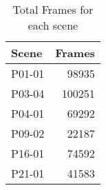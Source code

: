 \begin{table}[]
    \centering
    \begin{tabular}{lr}
    \hline
    \textbf{Scene} & \multicolumn{1}{c}{\textbf{Frames}} \\ \hline
    P01-01         & 98935                               \\
    P03-04         & 100251                              \\
    P04-01         & 69292                               \\
    P09-02         & 22187                               \\
    P16-01         & 74592                               \\
    P21-01         & 41583                               \\ \hline
    \end{tabular}
    \caption{Total Frames for each scene}\label{tab:Frames}
    \end{table}